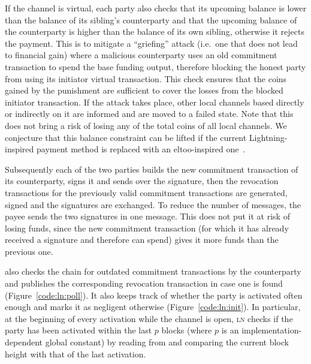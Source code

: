    If the channel is virtual, each party also checks that its upcoming balance is
  lower than the balance of its sibling's counterparty and that the upcoming
  balance of the counterparty is higher than the balance of its own sibling,
  otherwise it rejects the payment. This is to mitigate a ``griefing'' attack (i.e.\
  one that does not lead to financial gain) where a malicious counterparty
  uses an old commitment transaction to spend the base funding output, therefore
  blocking the honest party from using its initiator virtual transaction. This
  check ensures that the coins gained by the punishment are sufficient to cover
  the losses from the blocked initiator transaction. If the attack takes place,
  other local channels based directly or indirectly on it are informed and are
  moved to a failed state. Note that this does not bring a risk of losing any of
  the total coins of all local channels. We conjecture that this balance
  constraint can be lifted if the current Lightning-inspired payment method is
  replaced with an eltoo-inspired one~\cite{eltoo}.

  Subsequently each of the two parties builds the new commitment transaction of
  its counterparty, signs it and sends over the signature, then the revocation
  transactions for the previously valid commitment transactions are generated,
  signed and the signatures are exchanged. To reduce the number of messages, the
  payee sends the two signatures in one message. This does not put it at risk of
  losing funds, since the new commitment transaction (for which it has already
  received a signature and therefore can spend) gives it more funds than the
  previous one.

  \pchan also checks the chain for outdated commitment transactions by the
  counterparty and publishes the corresponding revocation transaction in case
  one is found (Figure~\ref{code:ln:poll}). It also keeps track of whether the
  party is activated often enough and marks it as negligent otherwise
  (Figure~\ref{code:ln:init}). In particular, at the beginning of every activation
  while the channel is open, \textsc{ln} checks if the party has been activated
  within the last $p$ blocks (where $p$ is an implementation-dependent global
  constant) by reading from \ledger and comparing the current block height with
  that of the last activation.

